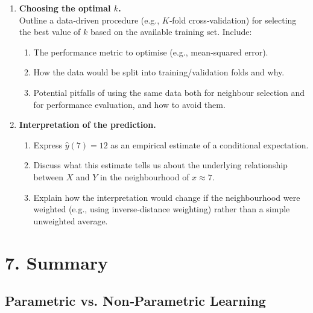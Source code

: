 \documentclass[12pt, a4paper]{article}
\begin{document}
\begin{enumerate}
  \item \textbf{Choosing the optimal \(k\).}\\
  Outline a data‑driven procedure (e.g., $K$‑fold cross‑validation) for
  selecting the best value of \(k\) based on the available training set.
  Include:
  \begin{enumerate}
    \item The performance metric to optimise (e.g., mean‑squared error).
    \item How the data would be split into training/validation folds and why.
    \item Potential pitfalls of using the same data both for neighbour
          selection and for performance evaluation, and how to avoid them.
  \end{enumerate}

  \item \textbf{Interpretation of the prediction.}\\
  \begin{enumerate}
    \item Express \(\hat y(7)=12\) as an empirical estimate of a conditional
          expectation.
    \item Discuss what this estimate tells us about the underlying relationship
          between \(X\) and \(Y\) in the neighbourhood of \(x\approx7\).
    \item Explain how the interpretation would change if the neighbourhood
          were weighted (e.g., using inverse‑distance weighting) rather than a
          simple unweighted average.
  \end{enumerate}
\end{enumerate}

\newpage

\section{7. Summary}

\subsection{Parametric vs. Non‑Parametric Learning}
\label{sec:parametric-nonparametric}
\end{document}
